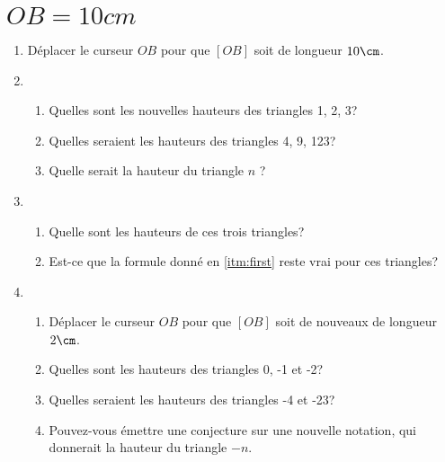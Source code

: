 \section{$OB = 10cm$}

\begin{enumerate}\setlength{\itemsep}{15pt}%
    \item Déplacer le curseur $OB$ pour que $[OB]$ soit de longueur $10\cm$.
    \item \begin{enumerate} \item Quelles sont les nouvelles hauteurs des triangles 1, 2, 3?
            \item Quelles seraient les hauteurs des triangles 4, 9, 123?
            \item \label{itm:first} Quelle serait la hauteur du triangle $n$ ?
    \end{enumerate}
    \item \begin{enumerate} 
        \item Quelle sont les hauteurs de ces trois triangles?
        \item Est-ce que la formule donné en \ref{itm:first} reste vrai pour ces triangles?
    \end{enumerate}
    \item \begin{enumerate}
        \item Déplacer le curseur $OB$ pour que $[OB]$ soit de nouveaux de longueur $2\cm$.
        \item Quelles sont les hauteurs des triangles 0, -1 et -2?
        \item Quelles seraient les hauteurs des triangles -4 et -23?
        \item Pouvez-vous émettre une conjecture sur une nouvelle notation,
        qui donnerait la hauteur du triangle $-n$.
    \end{enumerate}
\end{enumerate}